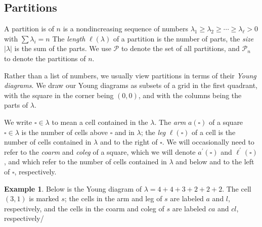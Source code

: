 \documentclass{amsart}[12pt]
\theoremstyle{definition}
\newtheorem{example}[dummy]{Example}
\newcommand{\PP}{\mathcal{P}} %
\begin{document}
\subsection{Partitions}


A partition is of $n$ is a nondincreasing sequence of numbers $\lambda_1\geq \lambda_2\geq \cdots \geq \lambda_\ell > 0$ with $\sum \lambda_i=n$  The \emph{length} $\ell(\lambda)$ of a partition is the number of parts, the \emph{size} $|\lambda|$ is the sum of the parts.  We use $\PP$ to denote the set of all partitions, and $\PP_n$ to denote the partitions of $n$.

Rather than a list of numbers, we usually view partitions in terms of their \emph{Young diagrams}.  We draw our Young diagrams as subsets of a grid in the first quadrant, with the square in the corner being $(0,0)$, and with the columns being the parts of $\lambda$.

We write $\square\in\lambda$ to mean a cell contained in the $\lambda$.  The \emph{arm} $a(\square)$ of a square $\square\in\lambda$ is the number of cells above $\square$ and in $\lambda$; the \emph{leg} $\ell(\square)$ of a cell is the number of cells contained in $\lambda$ and to the right of $\square$.  We will occasionally need to refer to the \emph{coarm} and \emph{coleg} of a square, which we will denote $a^\prime(\square)$ and $\ell^\prime(\square)$, and which refer to the number of cells contained in $\lambda$ and below and to the left of $\square$, respectively. 

\begin{example}
Below is the Young diagram of $\lambda=4+4+3+2+2+2$.  The cell $(3,1)$ is marked $s$; the cells in the arm and leg of $s$ are labeled $a$ and $l$, respectively, and the cells in the coarm and coleg of $s$ are labeled $ca$ and $cl$, respectively/
\begin{center}
\end{center}
\end{example}
\end{document}
